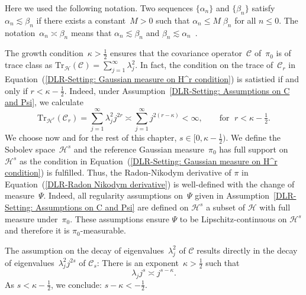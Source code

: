 Here we used the following notation. Two sequences $\{\alpha_n\}$ and $\{\beta_n\}$ satisfy $\alpha_n \lesssim  \beta_n$ if there exists a constant~$M>0$ such that $\alpha_n \leq M \; \beta_n$ for all $n \leq 0$. The notation~$\alpha_n \asymp \beta_n$ means that $\alpha_n \lesssim  \beta_n $ and $ \beta_n \lesssim  \alpha_n$~\autocite{Pillai2012}.

\begin{rem}
 The growth condition~$\kappa > \tfrac{1}{2}$ ensures that the covariance operator~$\mathcal{C}$ of~$\pi_0$ is of trace class as $\text{Tr}_{\mathcal{H}}(\mathcal{C}) = \sum_{j=1}^{\infty} \lambda_j^2$. In fact, the condition on the trace of~$\mathcal{C}_r$ in Equation~(\ref{DLR-Setting: Gaussian measure on H^r condition}) is satistied if and only if $r < \kappa - \tfrac{1}{2}$. Indeed, under Assumption~\ref{DLR-Setting: Assumptions on C and Psi}, we calculate
 \begin{equation*}
  \text{Tr}_{\mathcal{H}^r}(\mathcal{C}_r) = \sum_{j=1}^{\infty} \lambda_j^2 j^{2r}  \asymp \sum_{j=1}^{\infty} j^{2(r-\kappa)} < \infty, \qquad \text{for } \; r < \kappa - \tfrac{1}{2}.
 \end{equation*}
 We choose now and for the rest of this chapter, $s \in [0, \kappa - \tfrac{1}{2})$. We define the Sobolev space~$\mathcal{H}^s$ and the reference Gaussian measure~$\pi_0$ has full support on~$\mathcal{H}^s$ as the condition in Equation~(\ref{DLR-Setting: Gaussian measure on H^r condition}) is fulfilled. Thus, the Radon-Nikodym derivative of $\pi$ in Equation~(\ref{DLR-Radon Nikodym derivative}) is well-defined with the change of measure~$\Psi$. Indeed, all regularity assumptions on~$\Psi$ given in Assumption~\ref{DLR-Setting: Assumptions on C and Psi} are defined on $\mathcal{H}^s$ a subset of $\mathcal{H}$ with full measure under~$\pi_0$. These assumptions ensure $\Psi$ to be Lipschitz-continuous on $\mathcal{H}^s$ and therefore it is $\pi_0$-measurable. 

\end{rem}


\begin{rem}
  \label{DLR: Assumption on C_s}
  The assumption on the decay of eigenvalues~$\lambda_j^2$ of $\mathcal{C}$ results directly in the decay of eigenvalues~$\lambda_j^2 j^{2s}$ of $\mathcal{C}_s$: There is an exponent~$\kappa > \tfrac{1}{2}$ such that
 \begin{equation}
 \label{DLR-Seeting: Assumption on decay of eigenvalues of C_s}
 \lambda_j j^{s} \asymp j^{s - \kappa}.
 \end{equation}
 As $s < \kappa -\tfrac{1}{2}$, we conclude: $ s -\kappa < - \tfrac{1}{2} $.
\end{rem}



